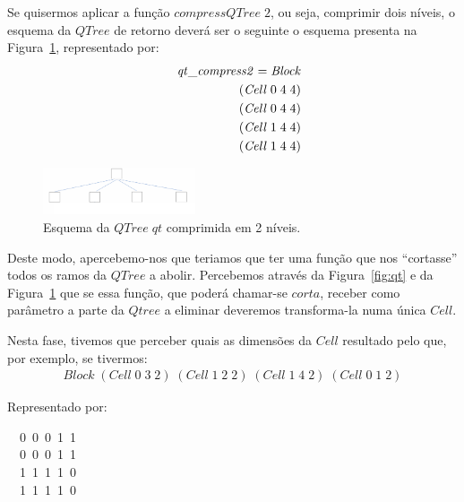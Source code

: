 \documentclass[a4paper]{article}
\newcommand{\Conid}[1]{\mathit{#1}}
\newcommand{\Varid}[1]{\mathit{#1}}
\begin{document}
\begin{enumerate}
Se quisermos aplicar a função \ensuremath{\Varid{compressQTree}\;\mathrm{2}}, ou seja, comprimir
dois níveis, o esquema da \ensuremath{\Conid{QTree}} de retorno deverá ser o seguinte
o esquema presenta na Figura~\ref{fig:qtcompress2}, representado por:
\begin{eqnarray*}
\start
\ensuremath{\Varid{qt\char95 compress2}\mathrel{=}\Conid{Block}}
\more
\ensuremath{(\Conid{Cell}\;\mathrm{0}\;\mathrm{4}\;\mathrm{4})}
\more
\ensuremath{(\Conid{Cell}\;\mathrm{0}\;\mathrm{4}\;\mathrm{4})}
\more
\ensuremath{(\Conid{Cell}\;\mathrm{1}\;\mathrm{4}\;\mathrm{4})}
\more
\ensuremath{(\Conid{Cell}\;\mathrm{1}\;\mathrm{4}\;\mathrm{4})}
\end{eqnarray*}

\begin{figure}
\begin{center}
\includegraphics[width=0.4\textwidth]{imgs/qtcompress2.png}
\end{center}
\caption{Esquema da \ensuremath{\Conid{QTree}\;\Varid{qt}} comprimida em 2 níveis.}
\label{fig:qtcompress2}
\end{figure}

Deste modo, apercebemo-nos que teriamos que ter uma função que nos ``cortasse'' todos
os ramos da \ensuremath{\Conid{QTree}} a abolir. Percebemos através da Figura~\ref{fig:qt}
e da Figura~\ref{fig:qtcompress2} que
se essa função, que poderá chamar-se \ensuremath{\Varid{corta}}, receber como parâmetro a parte da
\ensuremath{\Conid{Qtree}} a eliminar deveremos transforma-la numa única \ensuremath{\Conid{Cell}}.

Nesta fase, tivemos que perceber quais as dimensões da \ensuremath{\Conid{Cell}}
resultado pelo que, por exemplo, se tivermos:
\begin{eqnarray*}
\ensuremath{\Conid{Block}\;(\Conid{Cell}\;\mathrm{0}\;\mathrm{3}\;\mathrm{2})\;(\Conid{Cell}\;\mathrm{1}\;\mathrm{2}\;\mathrm{2})\;(\Conid{Cell}\;\mathrm{1}\;\mathrm{4}\;\mathrm{2})\;(\Conid{Cell}\;\mathrm{0}\;\mathrm{1}\;\mathrm{2})}
\end{eqnarray*}

Representado por:
\begin{tabbing}\ttfamily
~~0~0~0~1~1~\\
\ttfamily ~~0~0~0~1~1~\\
\ttfamily ~~1~1~1~1~0~\\
\ttfamily ~~1~1~1~1~0~
\end{tabbing}



\end{enumerate}
\end{document}
